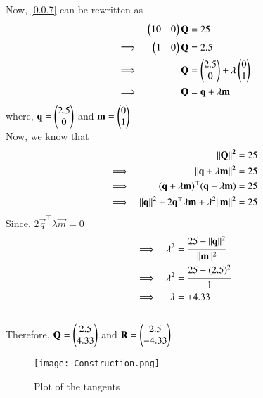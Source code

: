 \documentclass[journal,12pt,twocolumn]{IEEEtran}
\begin{document}
Now, \eqref{0.0.7} can be rewritten as
\begin{align}
&&\begin{pmatrix}10 & 0\end{pmatrix}\mathbf{Q} &= 25\\
&\implies& \begin{pmatrix}1 & 0\end{pmatrix}\mathbf{Q} &= 2.5\\
&\implies& \mathbf{Q} &= \begin{pmatrix}2.5 \\ 0\end{pmatrix} + \lambda \begin{pmatrix}0 \\ 1\end{pmatrix}\\
&\implies& \mathbf{Q} &= \mathbf{q} + \lambda \mathbf{m}
\end{align}
where, $\mathbf{q} = \begin{pmatrix}2.5 \\ 0\end{pmatrix}$ and $\mathbf{m} = \begin{pmatrix}0 \\ 1\end{pmatrix}$\\

Now, we know that
\begin{align}
&&\mathbf{\lVert Q\rVert^2} &= 25\\
&\implies& \lVert\mathbf{q}+\lambda \mathbf{m}\rVert^2 &= 25\\
&\implies& (\mathbf{q}+\lambda \mathbf{m})^\top(\mathbf{q}+\lambda \mathbf{m})&= 25\\
&\implies& \lVert\mathbf{q}\rVert^2 + 2\mathbf{q}^\top \lambda \mathbf{m} + \lambda^2 \lVert\mathbf{m}\rVert^2 &= 25
\end{align}
Since, $2\vec{q}^\top \lambda \vec{m} = 0$
\begin{align}
&\implies&\lambda^2 &= \cfrac{25-\lVert\mathbf{q}\rVert^2}{\lVert\mathbf{m}\rVert^2}\\
&\implies& \lambda^2 &= \cfrac{25-(2.5)^2}{1}\\
&\implies& \lambda &= \pm 4.33
\end{align}\\
Therefore, $\mathbf{Q} = \begin{pmatrix}2.5 \\ 4.33\end{pmatrix}$ and $\mathbf{R} = \begin{pmatrix}2.5 \\ -4.33\end{pmatrix}$ 

\begin{figure}[!ht]
\centering
\texttt{[image: Construction.png]}
\caption{Plot of the tangents}
\label{Plot}
\end{figure}
\end{document}
